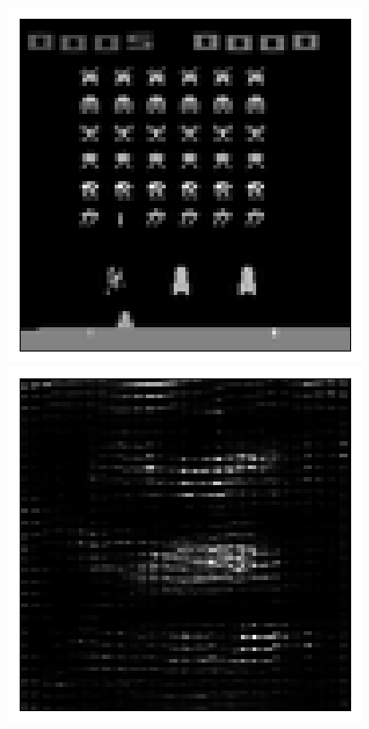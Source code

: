\begin{figure}[h!]
\centering
\captionsetup{justification=centering}
\begin{multicols}{4}
    \includegraphics[scale=0.4]{figures/results/latent_image/beta_1_posterior_sample_original.png}
    \includegraphics[scale=0.4]{figures/results/latent_image/beta_1_posterior_sample_0.png}

\end{multicols}
\end{figure}
